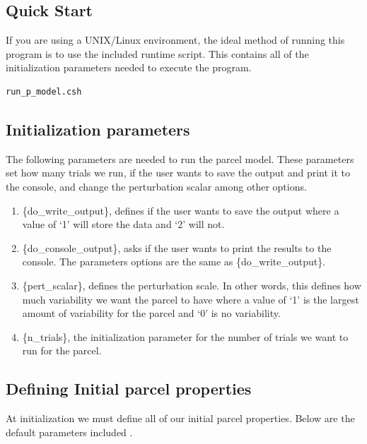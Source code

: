 \documentclass{article}
\begin{document}

\subsection{Quick Start}

If you are using a UNIX/Linux environment, the ideal method of running this program is to use the included runtime script. This contains all of the initialization parameters needed to execute the program.


\begin{verbatim}
run_p_model.csh
\end{verbatim}


\subsection{Initialization parameters}

The following parameters are needed to run the parcel model. These parameters set how many trials we run, if the user wants to save the output and print it to the console, and change the perturbation scalar among other options.

\begin{enumerate}

\item \{do\_write\_output\}, defines if the user wants to save the output where a value of `1' will store the data and `2' will not.

\item \{do\_console\_output\}, asks if the user wants to print the results to the console. The parameters options are the same as \{do\_write\_output\}.

\item \{pert\_scalar\}, defines the perturbation scale. In other words, this defines how much variability we want the parcel to have where a value of `1' is the largest amount of variability for the parcel and `0' is no variability.

\item \{n\_trials\}, the initialization parameter for the number of trials we want to run for the parcel.

\end{enumerate}

\subsection{Defining Initial parcel properties}\label{init-params}
At initialization we must define all of our initial parcel properties. Below are the default parameters included \cite{krueger}. 
\end{document}

